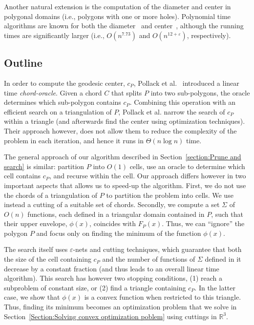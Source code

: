\documentclass[a4paper]{article}
\newcommand{\F}[2]{\ensuremath{F_{\scriptscriptstyle #1}(#2)}}
\newcommand{\cp}{\ensuremath{c_P}}
\begin{document}
Another natural extension is the computation of the diameter and center in polygonal domains (i.e., polygons with one or more holes). Polynomial time algorithms are known for both the diameter~\cite{bko-gdpd-13} and center~\cite{bko-cgcpd-14}, although the running times are significantly larger (i.e., $O(n^{7.73})$ and $O(n^{12+\varepsilon})$, respectively).

\subsection{Outline}
In order to compute the geodesic center, $\cp$, Pollack et al.~\cite{pollackComputingCenter} introduced a linear time \emph{chord-oracle}. Given a chord $C$ that splits $P$ into two sub-polygons, the oracle determines which sub-polygon contains $\cp$. Combining this operation with an efficient search on a triangulation of $P$, Pollack et al. narrow the search of $\cp$ within a triangle (and afterwards find the center using optimization techniques). Their approach however, does not allow them to reduce the complexity of the problem in each iteration, and hence it runs in $\Theta(n\log n)$ time. 

The general approach of our algorithm described in Section~\ref{section:Prune and search} is similar: 
partition $P$ into $O(1)$ cells, use an oracle to determine which cell contains $\cp$, and recurse within the cell. 
Our approach differs however in two important aspects that allows us to speed-up the algorithm. 
First, we do not use the chords of a triangulation of $P$ to partition the problem into cells. 
We use instead a cutting of a suitable set of chords.
Secondly, we compute a set $\Sigma$ of $O(n)$ functions, each defined in a triangular domain contained in $P$, such that their upper envelope, $\phi(x)$, coincides with $\F{P}{x}$. 
Thus, we can ``ignore'' the polygon $P$ and focus only on finding the minimum of the function $\phi(x)$. 

The search itself uses $\varepsilon$-nets and cutting techniques,
which guarantee that both the size of the cell containing $\cp$ and the number of functions of $\Sigma$ defined in it decrease by a constant fraction 
(and thus leads to an overall linear time algorithm).
This search has however two stopping conditions, (1) reach a subproblem of constant size, 
or (2) find a triangle containing $\cp$.
In the latter case, 
we show that $\phi(x)$ is a convex function when restricted to this triangle. 
Thus, finding its minimum becomes an optimization problem that we solve in Section~\ref{Section:Solving convex optimization poblem} using cuttings in $\mathbb{R}^3$.
\end{document}

